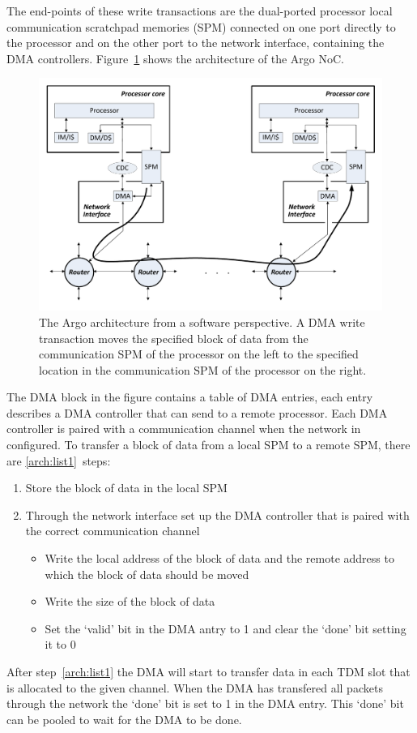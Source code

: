 \documentclass[a4paper,fontsize=10pt,twoside,DIV15,BCOR12mm,headinclude=true,footinclude=false,pagesize,bibtotoc]{scrbook}
\begin{document}
The end-points of these write transactions are the dual-ported
processor local communication scratchpad memories (SPM) connected
on one port directly to the processor and on the other port to the 
network interface, containing the DMA controllers.
Figure~\ref{fig:argo-arch} shows the architecture of the Argo NoC.
\begin{figure}[h]
\centering
\includegraphics[width=\textwidth]{fig/argo-arch.pdf}
\caption{The Argo architecture from a software perspective.
A DMA write transaction moves the specified block of data from the
communication SPM of the processor on the left to the specified
location in the communication SPM of the processor on the right.}
\label{fig:argo-arch}
\end{figure}
The DMA block in the figure contains a table of DMA entries,
each entry describes a DMA controller that can send to a remote processor.
Each DMA controller is paired with a communication channel when the network in configured. 
To transfer a block of data from a local SPM to a remote SPM, there are \ref{arch:list1}~steps:
\begin{enumerate}
\item Store the block of data in the local SPM
\item Through the network interface set up the DMA controller that is paired with the correct communication channel
  \begin{itemize}
  \item Write the local address of the block of data and the remote address to which the block of data should be moved
  \item Write the size of the block of data
  \item Set the `valid' bit in the DMA antry to 1 and clear the `done' bit setting it to 0
  \end{itemize}
\label{arch:list1}\end{enumerate}
After step~\ref{arch:list1} the DMA will start to transfer data in each TDM slot that is allocated to the given channel.
When the DMA has transfered all packets through the network the `done' bit is set to 1 in the DMA entry. This `done' bit can be pooled to wait for the DMA to be done.
\end{document}
